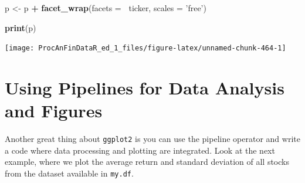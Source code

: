 \documentclass[11pt,]{book}
\newenvironment{Shaded}{\begin{snugshade}}{\end{snugshade}}
\newcommand{\KeywordTok}[1]{\textcolor[rgb]{0.27,0.27,0.27}{\textbf{#1}}}
\newcommand{\DataTypeTok}[1]{\textcolor[rgb]{0.27,0.27,0.27}{#1}}
\newcommand{\StringTok}[1]{\textcolor[rgb]{0.5,0.5,0.5}{#1}}
\newcommand{\CommentTok}[1]{\textcolor[rgb]{0.56,0.35,0.01}{\textit{#1}}}
\newcommand{\OperatorTok}[1]{\textcolor[rgb]{0.81,0.36,0.00}{\textbf{#1}}}
\newcommand{\NormalTok}[1]{#1}
\begin{document}
\begin{Shaded}
\begin{Highlighting}[]
\NormalTok{p <-}\StringTok{ }\NormalTok{p }\OperatorTok{+}\StringTok{ }\KeywordTok{facet_wrap}\NormalTok{(}\DataTypeTok{facets =} \OperatorTok{~}\NormalTok{ticker, }\DataTypeTok{scales =} \StringTok{'free'}\NormalTok{)}
    
\KeywordTok{print}\NormalTok{(p)}
\end{Highlighting}
\end{Shaded}

\begin{center}\texttt{[image: ProcAnFinDataR\_ed\_1\_files/figure-latex/unnamed-chunk-464-1]} \end{center}

\section{Using Pipelines for Data Analysis and
Figures}\label{using-pipelines-for-data-analysis-and-figures}

Another great thing about \texttt{ggplot2} is you can use the pipeline
operator and write a code where data processing and plotting are
integrated. Look at the next example, where we plot the average return
and standard deviation of all stocks from the dataset available in
\texttt{my.df}.

\begin{Shaded}
\end{Shaded}
\end{document}

